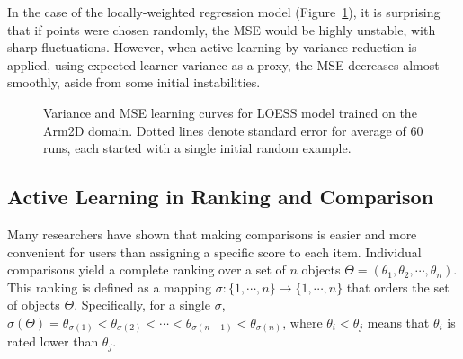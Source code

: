 \documentclass[
  letterpaper,
  numbers=noenddot,
  DIV=11]{scrreprt}
\theoremstyle{definition}
\theoremstyle{plain}
\theoremstyle{plain}
\theoremstyle{remark}
\begin{document}
In the case of the locally-weighted regression model
(Figure~\ref{fig-empirical:regress}), it is surprising that if points
were chosen randomly, the MSE would be highly unstable, with sharp
fluctuations. However, when active learning by variance reduction is
applied, using expected learner variance as a proxy, the MSE decreases
almost smoothly, aside from some initial instabilities.

\begin{figure}


\caption{\label{fig-empirical:regress}Variance and MSE learning curves
for LOESS model trained on the Arm2D domain. Dotted lines denote
standard error for average of 60 runs, each started with a single
initial random example.}

\end{figure}%

\subsection{Active Learning in Ranking and
Comparison}\label{active-learning-in-ranking-and-comparison}

Many researchers have shown that making comparisons is easier and more
convenient for users than assigning a specific score to each item.
Individual comparisons yield a complete ranking over a set of \(n\)
objects \(\Theta = (\theta_1, \theta_2, \cdots, \theta_n)\). This
ranking is defined as a mapping
\(\sigma : \{1, \cdots, n\} \rightarrow \{1,\cdots, n\}\) that orders
the set of objects \(\Theta\). Specifically, for a single \(\sigma\),
\(\sigma(\Theta) = \theta_{\sigma(1)} < \theta_{\sigma(2)} < \cdots < \theta_{\sigma(n-1)} < \theta_{\sigma(n)}\),
where \(\theta_{i} < \theta_{j}\) means that \(\theta_{i}\) is rated
lower than \(\theta_{j}\).
\end{document}
